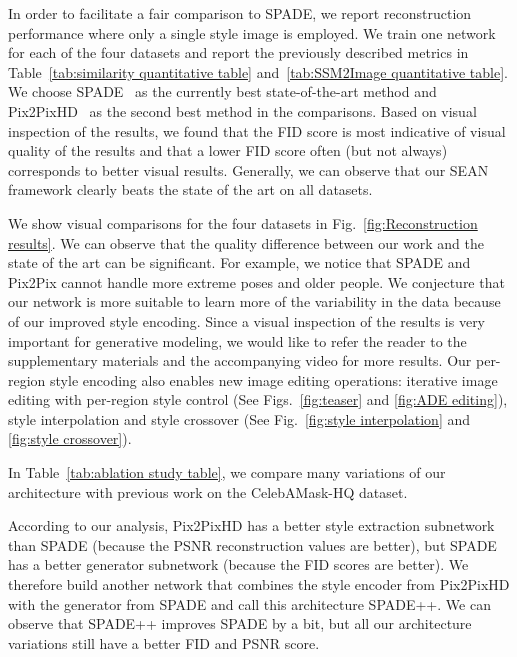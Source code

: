 \documentclass[10pt,twocolumn,letterpaper]{article}
\begin{document}
\vspace*{2mm} 
In order to facilitate a fair comparison to SPADE, we report reconstruction performance where only a single style image is employed.
We train one network for each of the four datasets and report the previously described metrics in Table~\ref{tab:similarity quantitative table} and~\ref{tab:SSM2Image quantitative table}. We choose SPADE~\cite{park2019SPADE} as the currently best state-of-the-art method and Pix2PixHD~\cite{wang2018pix2pixHD} as the second best method in the comparisons. Based on visual inspection of the results, we found that the FID score is most indicative of visual quality of the results and that a lower FID score often (but not always) corresponds to better visual results. Generally, we can observe that our SEAN framework clearly beats the state of the art on all datasets.

\vspace*{2mm}
We show visual comparisons for the four datasets in Fig.~\ref{fig:Reconstruction results}. We can observe that the quality difference between our work and the state of the art can be significant. For example, we notice that SPADE and Pix2Pix cannot handle more extreme poses and older people. We conjecture that our network is more suitable to learn more of the variability in the data because of our improved style encoding.
Since a visual inspection of the results is very important for generative modeling, we would like to refer the reader to the supplementary materials and the accompanying video for more results. Our per-region style encoding also enables new image editing operations: iterative image editing with per-region style control (See Figs.~\ref{fig:teaser} and \ref{fig:ADE editing}), style interpolation and style crossover (See Fig.~\ref{fig:style interpolation} and \ref{fig:style crossover}).

\vspace*{2mm}
In Table~\ref{tab:ablation study table}, we compare many variations of our architecture with previous work on the CelebAMask-HQ dataset.

According to our analysis, Pix2PixHD has a better style extraction subnetwork than SPADE (because the PSNR reconstruction values are better), but SPADE has a better generator subnetwork (because the FID scores are better). We therefore build another network that combines the style encoder from Pix2PixHD with the generator from SPADE and call this architecture SPADE++. We can observe that SPADE++ improves SPADE by a bit, but all our architecture variations still have a better FID and PSNR score.
\end{document}
